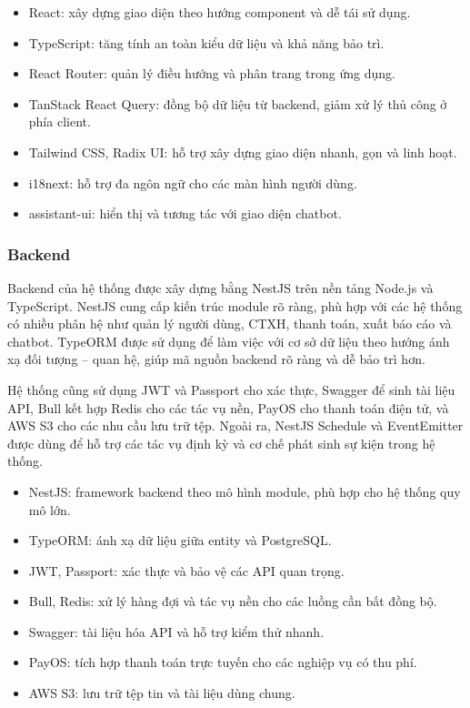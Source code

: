 \begin{itemize}
    \item React: xây dựng giao diện theo hướng component và dễ tái sử dụng.
    \item TypeScript: tăng tính an toàn kiểu dữ liệu và khả năng bảo trì.
    \item React Router: quản lý điều hướng và phân trang trong ứng dụng.
    \item TanStack React Query: đồng bộ dữ liệu từ backend, giảm xử lý thủ công ở phía client.
    \item Tailwind CSS, Radix UI: hỗ trợ xây dựng giao diện nhanh, gọn và linh hoạt.
    \item i18next: hỗ trợ đa ngôn ngữ cho các màn hình người dùng.
    \item assistant-ui: hiển thị và tương tác với giao diện chatbot.
\end{itemize}

\subsubsection{Backend}
Backend của hệ thống được xây dựng bằng NestJS trên nền tảng Node.js và TypeScript. NestJS cung cấp kiến trúc module rõ ràng, phù hợp với các hệ thống có nhiều phân hệ như quản lý người dùng, CTXH, thanh toán, xuất báo cáo và chatbot. TypeORM được sử dụng để làm việc với cơ sở dữ liệu theo hướng ánh xạ đối tượng -- quan hệ, giúp mã nguồn backend rõ ràng và dễ bảo trì hơn.

Hệ thống cũng sử dụng JWT và Passport cho xác thực, Swagger để sinh tài liệu API, Bull kết hợp Redis cho các tác vụ nền, PayOS cho thanh toán điện tử, và AWS S3 cho các nhu cầu lưu trữ tệp. Ngoài ra, NestJS Schedule và EventEmitter được dùng để hỗ trợ các tác vụ định kỳ và cơ chế phát sinh sự kiện trong hệ thống.

\begin{itemize}
    \item NestJS: framework backend theo mô hình module, phù hợp cho hệ thống quy mô lớn.
    \item TypeORM: ánh xạ dữ liệu giữa entity và PostgreSQL.
    \item JWT, Passport: xác thực và bảo vệ các API quan trọng.
    \item Bull, Redis: xử lý hàng đợi và tác vụ nền cho các luồng cần bất đồng bộ.
    \item Swagger: tài liệu hóa API và hỗ trợ kiểm thử nhanh.
    \item PayOS: tích hợp thanh toán trực tuyến cho các nghiệp vụ có thu phí.
    \item AWS S3: lưu trữ tệp tin và tài liệu dùng chung.
\end{itemize}

